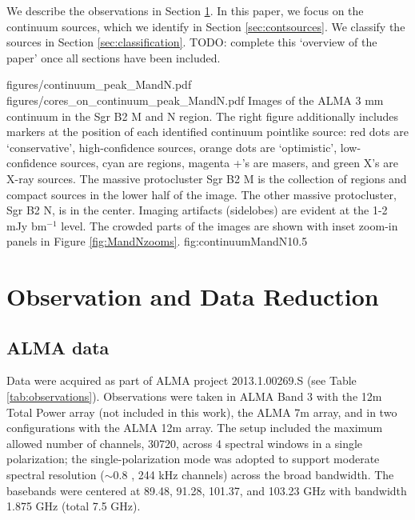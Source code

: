 \documentclass[twocolumn]{aastex61}
\begin{document}
We describe the observations in Section \ref{sec:observations}. In this paper,
we focus on the continuum sources, which we identify in Section
\ref{sec:contsources}.  We classify the sources in Section
\ref{sec:classification}.  
{\color{red} TODO: complete this `overview of the paper' once all sections have
been included.}

\FigureTwo
{figures/continuum_peak_MandN.pdf}
{figures/cores_on_continuum_peak_MandN.pdf}
{Images of the ALMA 3 mm continuum in the Sgr B2 M and N region.  The right
figure additionally includes markers at the position of each identified
continuum pointlike source: red dots are `conservative', high-confidence
sources, orange dots are `optimistic', low-confidence sources, cyan are \hii
regions, magenta +'s are masers, and green X's are X-ray sources.  The massive
protocluster Sgr B2 M is the collection of \hii regions and compact sources in
the lower half of the image.  The other massive protocluster, Sgr B2 N, is in
the center.  Imaging artifacts (sidelobes) are evident at the 1-2 mJy bm$^{-1}$
level.  The crowded parts of the images are shown with inset zoom-in panels in
Figure \ref{fig:MandNzooms}.
}
{fig:continuumMandN}{1}{0.5\textwidth}

\section{Observation and Data Reduction}
\label{sec:observations}
\subsection{ALMA data}
Data were acquired as part of ALMA project 2013.1.00269.S (see Table
\ref{tab:observations}).  Observations were taken in ALMA Band 3 with the 12m
Total Power array (not included in this work), the ALMA 7m array, and in two
configurations with the ALMA 12m array.  The setup included the maximum allowed
number of channels, 30720, across 4 spectral windows in a single polarization;
the single-polarization mode was adopted to support moderate spectral
resolution ($\sim0.8$ \kms, 244 kHz channels) across the broad bandwidth.  The
basebands were centered at 89.48, 91.28, 101.37, and 103.23 GHz with bandwidth
1.875 GHz (total
7.5 GHz).
\end{document}
